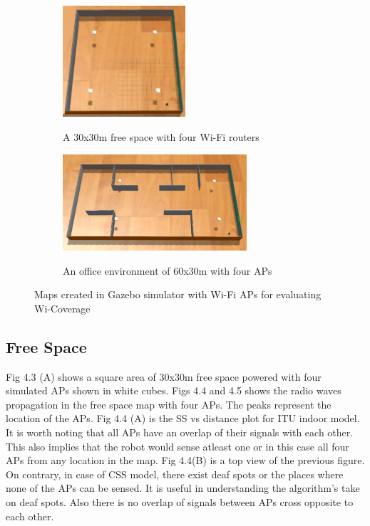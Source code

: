 \begin{figure}[!h]
    \centering
	\begin{subfigure}[b]{\textwidth}
	    \centering
		\includegraphics[width=0.5\textwidth]{images/squarespace.png}
		\label{subfig:a}
		\caption{A 30x30m free space with four Wi-Fi routers}
		\vspace{2em}
	\end{subfigure}
	\begin{subfigure}[b]{\textwidth}
	    \centering
		\includegraphics[width=0.75\textwidth]{images/officearea.png}
		\label{subfig:b}
		\caption{An office environment of 60x30m with four APs}
	\end{subfigure}
\caption{Maps created in Gazebo simulator with Wi-Fi APs for evaluating Wi-Coverage}
\end{figure}

\subsection{Free Space}
Fig 4.3 (A) shows a square area of 30x30m free space powered with four simulated APs shown in white cubes.  Figs 4.4 and 4.5 shows the radio waves propagation in the free space map with four APs. The peaks represent the location of the APs. Fig 4.4 (A) is the SS vs distance plot for ITU indoor model. It is worth noting that all APs have an overlap of their signals with each other. This also implies that the robot would sense atleast one or in this case all four APs from any location in the map. Fig 4.4(B) is a top view of the previous figure. On contrary, in case of CSS model, there exist deaf spots or the places where none of the APs can be sensed. It is useful in understanding the algorithm's take on deaf spots. Also there is no overlap of signals between APs cross opposite to each other. 

